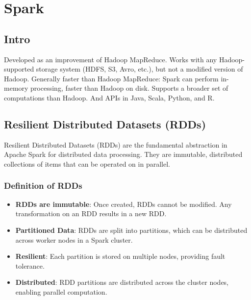 \documentclass[12pt]{article}
\begin{document}
\section{Spark}
\subsection{Intro}
Developed as an improvement of Hadoop MapReduce. Works with any Hadoop-supported storage system (HDFS, S3, Avro, etc.), but not a modified version of Hadoop. Generally faster than Hadoop MapReduce: Spark can perform in-memory processing, faster than Hadoop on disk. Supports a broader set of computations than Hadoop. And APIs in Java, Scala, Python, and R.

\subsection{Resilient Distributed Datasets (RDDs)}
Resilient Distributed Datasets (RDDs) are the fundamental abstraction in Apache Spark for distributed data processing. They are immutable, distributed collections of items that can be operated on in parallel.

\subsubsection*{Definition of RDDs}
\begin{itemize}
    \item \textbf{RDDs are immutable}: Once created, RDDs cannot be modified. Any transformation on an RDD results in a new RDD.
    \item \textbf{Partitioned Data}: RDDs are split into partitions, which can be distributed across worker nodes in a Spark cluster.
    \item \textbf{Resilient}: Each partition is stored on multiple nodes, providing fault tolerance.
    \item \textbf{Distributed}: RDD partitions are distributed across the cluster nodes, enabling parallel computation.
\end{itemize}
\end{document}
